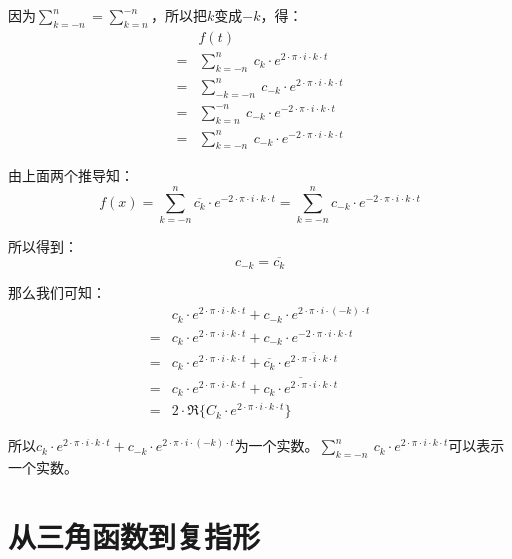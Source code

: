 因为$\sum\limits_{k=-n}^n=\sum\limits_{k=n}^{-n}$，所以把$k$变成$-k$，得：
\begin{align*}
	  & f(t)                                                                        \\
	= & \sum\limits_{k=-n}^n\ c_k\cdot e^{2\cdot \pi \cdot i \cdot k \cdot t}       \\
	= & \sum\limits_{-k=-n}^n\ c_{-k}\cdot e^{2\cdot \pi \cdot i \cdot k \cdot t}   \\
	= & \sum\limits_{k=n}^{-n}\ c_{-k}\cdot e^{-2\cdot \pi \cdot i \cdot k \cdot t} \\
	= & \sum\limits_{k=-n}^n\ c_{-k}\cdot e^{-2\cdot \pi \cdot i \cdot k \cdot t}
\end{align*}

由上面两个推导知：
$$
	f(x)=\sum\limits_{k=-n}^n \overline{c_k}\cdot e^{-2\cdot \pi \cdot i \cdot k \cdot t}=\sum\limits_{k=-n}^n c_{-k}\cdot e^{-2\cdot \pi \cdot i \cdot k \cdot t}
$$


所以得到：
\begin{equation}
	c_{-k}=\overline{c_k}
\end{equation}

那么我们可知：
\begin{align*}
	  & c_k\cdot e^{2\cdot \pi\cdot i\cdot k\cdot t}+c_{-k}\cdot e^{2\cdot \pi\cdot i\cdot (-k)\cdot t}                 \\
	= & c_k\cdot e^{2\cdot \pi\cdot i\cdot k\cdot t}+c_{-k}\cdot e^{-2\cdot \pi\cdot i\cdot k\cdot t}                   \\
	= & c_k\cdot e^{2\cdot \pi\cdot i\cdot k\cdot t}+\overline{c_k}\cdot e^{\overline{2\cdot \pi\cdot i\cdot k\cdot t}} \\
	= & c_k\cdot e^{2\cdot \pi\cdot i\cdot k\cdot t}+\overline{c_k\cdot e^{2\cdot \pi\cdot i\cdot k\cdot t}}            \\
	= & 2\cdot \Re\{C_k\cdot e^{2\cdot \pi \cdot i\cdot k\cdot t}\}
\end{align*}

所以$c_k\cdot e^{2\cdot \pi\cdot i\cdot k\cdot t}+c_{-k}\cdot e^{2\cdot \pi\cdot i\cdot (-k)\cdot t}$为一个实数。$\sum\limits_{k=-n}^n\ c_k\cdot e^{2\cdot \pi \cdot i \cdot k \cdot t}$可以表示一个实数。

\section{从三角函数到复指形}
